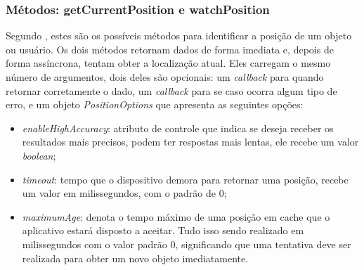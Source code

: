 \subsubsection{Métodos: getCurrentPosition e watchPosition}


Segundo , estes são os possíveis métodos para identificar a posição de um objeto ou usuário. Os dois métodos retornam dados de forma imediata e, depois de forma assíncrona, tentam obter a localização atual. Eles carregam o mesmo número de argumentos, dois deles são opcionais: um \textit{callback} para quando retornar corretamente o dado, um \textit{callback} para se caso ocorra algum tipo de erro, e um objeto \textit{PositionOptions} que apresenta as seguintes opções:

\begin{itemize}
    \item \textit{enableHighAccuracy}: atributo de controle que indica se deseja receber os resultados mais precisos, podem ter respostas mais lentas, ele recebe um valor \textit{boolean};
    \item \textit{timeout}: tempo que o dispositivo demora para retornar uma posição, recebe um valor em milissegundos, com o padrão de 0;
    \item \textit{maximumAge}: denota o tempo máximo de uma posição em cache que o aplicativo estará disposto a aceitar. Tudo isso sendo realizado em milissegundos com o valor padrão 0, significando que uma tentativa deve ser realizada para obter um novo objeto imediatamente.
\end{itemize}


